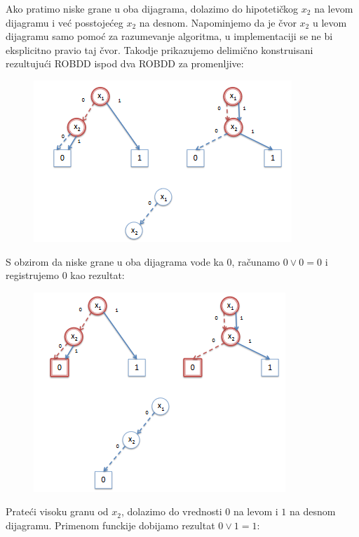 \begin{exmp}
    Ako pratimo niske grane u oba dijagrama, dolazimo do hipoteti\v{c}kog $x_{2}$ na levom dijagramu i ve\'c{} posstoje\'c{}eg $x_{2}$ na desnom. Napominjemo da je \v{c}vor $x_{2}$ u levom dijagramu samo pomo\'c{} za razumevanje algoritma, u implementaciji se ne bi eksplicitno pravio taj \v{c}vor. Takodje prikazujemo delimi\v{c}no konstruisani rezultuju\'c{}i ROBDD ispod dva ROBDD za promenljive:

    \begin{figure}[H]
        \centering
        \includegraphics{slike/ROBDD_primer_3.PNG}
    \end{figure}

    S obzirom da niske grane u oba dijagrama vode ka 0, ra\v{c}unamo $0 \vee 0 = 0$ i registrujemo $0$ kao rezultat:

    \begin{figure}[H]
        \centering
        \includegraphics{slike/ROBDD_primer_4.PNG}
    \end{figure}

    Prate\'c{}i visoku granu od $x_{2}$, dolazimo do vrednosti $0$ na levom i $1$ na desnom dijagramu. Primenom funckije dobijamo rezultat $0 \vee 1 = 1$:


\end{exmp}
